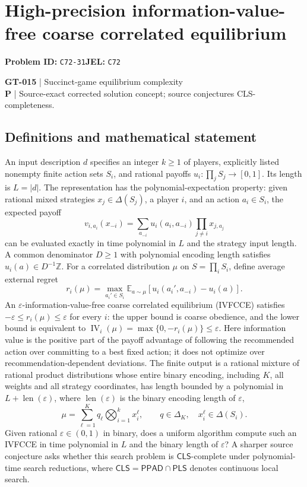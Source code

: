 \documentclass[11pt,a4paper]{article}
\begin{document}
\section*{High-precision information-value-free coarse correlated equilibrium}
\textbf{Problem ID:} \texttt{C72-31}\quad \textbf{JEL:} \texttt{C72}\par
\label{problem:OP-0145}
\label{game:GT-015}
{\sffamily\small\color{muted}
\textbf{GT-015} | Succinct-game equilibrium complexity\\
\textbf{P} | Source-exact corrected solution concept; source conjectures CLS-completeness.
\par}
\subsection*{Definitions and mathematical statement}
An input description $d$ specifies an integer $k\geq1$ of players, explicitly listed nonempty finite action sets $S_i$, and rational payoffs $u_i:\prod_jS_j\to[0,1]$. Its length is $L=|d|$. The representation has the polynomial-expectation property: given rational mixed strategies $x_j\in\Delta(S_j)$, a player $i$, and an action $a_i\in S_i$, the expected payoff
\[
 v_{i,a_i}(x_{-i})=\sum_{a_{-i}}u_i(a_i,a_{-i})\prod_{j\ne i}x_{j,a_j}
\]
can be evaluated exactly in time polynomial in $L$ and the strategy input length. A common denominator $D\geq1$ with polynomial encoding length satisfies $u_i(a)\in D^{-1}\mathbb Z$. For a correlated distribution $\mu$ on $S=\prod_iS_i$, define average external regret
\[
 r_i(\mu)=\max_{a_i'\in S_i}\mathbb E_{a\sim\mu}
 [u_i(a_i',a_{-i})-u_i(a)].
\]
An $\varepsilon$-information-value-free coarse correlated equilibrium (IVFCCE) satisfies $-\varepsilon\leq r_i(\mu)\leq\varepsilon$ for every $i$: the upper bound is coarse obedience, and the lower bound is equivalent to $\operatorname{IV}_i(\mu)=\max\{0,-r_i(\mu)\}\leq\varepsilon$. Here information value is the positive part of the payoff advantage of following the recommended action over committing to a best fixed action; it does not optimize over recommendation-dependent deviations. The finite output is a rational mixture of rational product distributions whose entire binary encoding, including $K$, all weights and all strategy coordinates, has length bounded by a polynomial in $L+\operatorname{len}(\varepsilon)$, where $\operatorname{len}(\varepsilon)$ is the binary encoding length of $\varepsilon$,
\[
 \mu=\sum_{\ell=1}^Kq_\ell\bigotimes_{i=1}^kx_i^\ell,
 \qquad q\in\Delta_K,\quad x_i^\ell\in\Delta(S_i).
\]
Given rational $\varepsilon\in(0,1)$ in binary, does a uniform algorithm compute such an IVFCCE in time polynomial in $L$ and the binary length of $\varepsilon$? A sharper source conjecture asks whether this search problem is $\mathsf{CLS}$-complete under polynomial-time search reductions, where $\mathsf{CLS}=\mathsf{PPAD}\cap\mathsf{PLS}$ denotes continuous local search.
\end{document}

